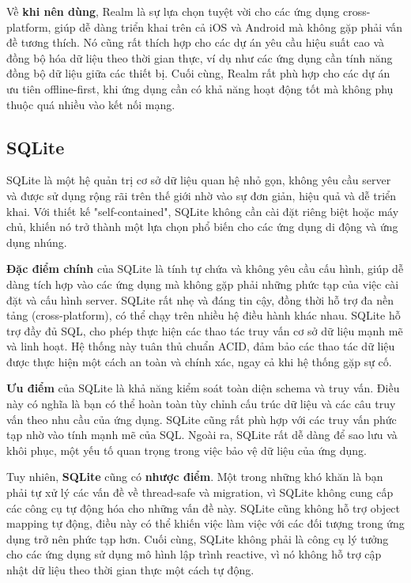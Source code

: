 \vspace{0.5em}

Về \textbf{khi nên dùng}, Realm là sự lựa chọn tuyệt vời cho các ứng dụng cross-platform, giúp dễ dàng triển khai trên cả iOS và Android mà không gặp phải vấn đề tương thích. Nó cũng rất thích hợp cho các dự án yêu cầu hiệu suất cao và đồng bộ hóa dữ liệu theo thời gian thực, ví dụ như các ứng dụng cần tính năng đồng bộ dữ liệu giữa các thiết bị. Cuối cùng, Realm rất phù hợp cho các dự án ưu tiên offline-first, khi ứng dụng cần có khả năng hoạt động tốt mà không phụ thuộc quá nhiều vào kết nối mạng.

\subsection{SQLite}
SQLite là một hệ quản trị cơ sở dữ liệu quan hệ nhỏ gọn, không yêu cầu server và được sử dụng rộng rãi trên thế giới nhờ vào sự đơn giản, hiệu quả và dễ triển khai. Với thiết kế "self-contained", SQLite không cần cài đặt riêng biệt hoặc máy chủ, khiến nó trở thành một lựa chọn phổ biến cho các ứng dụng di động và ứng dụng nhúng.

\vspace{0.5em}

\textbf{Đặc điểm chính} của SQLite là tính tự chứa và không yêu cầu cấu hình, giúp dễ dàng tích hợp vào các ứng dụng mà không gặp phải những phức tạp của việc cài đặt và cấu hình server. SQLite rất nhẹ và đáng tin cậy, đồng thời hỗ trợ đa nền tảng (cross-platform), có thể chạy trên nhiều hệ điều hành khác nhau. SQLite hỗ trợ đầy đủ SQL, cho phép thực hiện các thao tác truy vấn cơ sở dữ liệu mạnh mẽ và linh hoạt. Hệ thống này tuân thủ chuẩn ACID, đảm bảo các thao tác dữ liệu được thực hiện một cách an toàn và chính xác, ngay cả khi hệ thống gặp sự cố.

\vspace{0.5em}

\textbf{Ưu điểm} của SQLite là khả năng kiểm soát toàn diện schema và truy vấn. Điều này có nghĩa là bạn có thể hoàn toàn tùy chỉnh cấu trúc dữ liệu và các câu truy vấn theo nhu cầu của ứng dụng. SQLite cũng rất phù hợp với các truy vấn phức tạp nhờ vào tính mạnh mẽ của SQL. Ngoài ra, SQLite rất dễ dàng để sao lưu và khôi phục, một yếu tố quan trọng trong việc bảo vệ dữ liệu của ứng dụng.

\vspace{0.5em}

Tuy nhiên, \textbf{SQLite} cũng có \textbf{nhược điểm}. Một trong những khó khăn là bạn phải tự xử lý các vấn đề về thread-safe và migration, vì SQLite không cung cấp các công cụ tự động hóa cho những vấn đề này. SQLite cũng không hỗ trợ object mapping tự động, điều này có thể khiến việc làm việc với các đối tượng trong ứng dụng trở nên phức tạp hơn. Cuối cùng, SQLite không phải là công cụ lý tưởng cho các ứng dụng sử dụng mô hình lập trình reactive, vì nó không hỗ trợ cập nhật dữ liệu theo thời gian thực một cách tự động.

